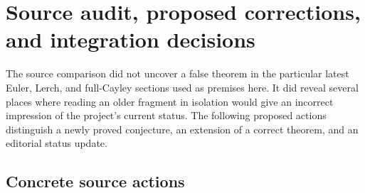 \documentclass[11pt,a4paper]{article}
\numberwithin{equation}{section}
\theoremstyle{definition}
\theoremstyle{remark}
\begin{document}


\section{Source audit, proposed corrections, and integration decisions}
\label{sec:audit}

The source comparison did not uncover a false theorem in the particular
latest Euler, Lerch, and full-Cayley sections used as premises here.
It did reveal several places where reading an older fragment in isolation
would give an incorrect impression of the project's current status.
The following proposed actions distinguish a newly proved conjecture,
an extension of a correct theorem, and an editorial status update.

\subsection{Concrete source actions}
\end{document}
